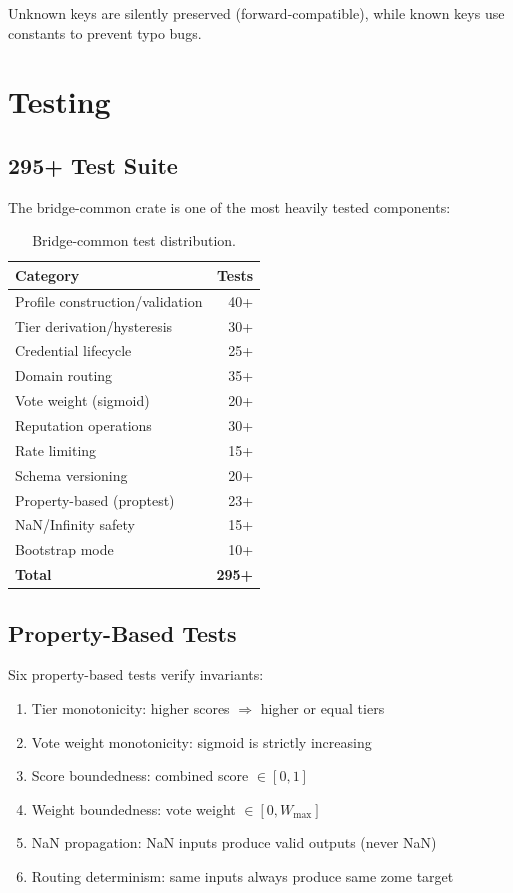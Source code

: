 \documentclass[11pt,twocolumn]{article}
\begin{document}
Unknown keys are silently preserved (forward-compatible), while known
keys use constants to prevent typo bugs.

\section{Testing}

\subsection{295+ Test Suite}

The bridge-common crate is one of the most heavily tested components:

\begin{table}[h]
\centering
\begin{tabular}{lr}
\toprule
\textbf{Category} & \textbf{Tests} \\
\midrule
Profile construction/validation & 40+ \\
Tier derivation/hysteresis & 30+ \\
Credential lifecycle & 25+ \\
Domain routing & 35+ \\
Vote weight (sigmoid) & 20+ \\
Reputation operations & 30+ \\
Rate limiting & 15+ \\
Schema versioning & 20+ \\
Property-based (proptest) & 23+ \\
NaN/Infinity safety & 15+ \\
Bootstrap mode & 10+ \\
\midrule
\textbf{Total} & \textbf{295+} \\
\bottomrule
\end{tabular}
\caption{Bridge-common test distribution.}
\end{table}

\subsection{Property-Based Tests}

Six property-based tests verify invariants:

\begin{enumerate}[nosep]
  \item Tier monotonicity: higher scores $\Rightarrow$ higher or equal tiers
  \item Vote weight monotonicity: sigmoid is strictly increasing
  \item Score boundedness: combined score $\in [0, 1]$
  \item Weight boundedness: vote weight $\in [0, W_{\max}]$
  \item NaN propagation: NaN inputs produce valid outputs (never NaN)
  \item Routing determinism: same inputs always produce same zome target
\end{enumerate}
\end{document}
